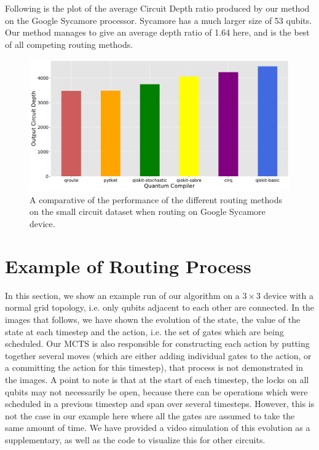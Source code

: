 Following is the plot of the average Circuit Depth ratio produced by our method on the Google Sycamore processor. Sycamore has a much larger size of 53 qubits. Our method manages to give an average depth ratio of 1.64 here, and is the best of all competing routing methods.

\begin{figure}[ht]
    \centering
    \includegraphics[width=\linewidth]{figures/qroute/sycamore.pdf}
    \caption{\label{fig:supp-sycamore-results}A comparative of the performance of the different routing methods on the small circuit dataset when routing on Google Sycamore device.}
\end{figure}

\onecolumn

\section{Example of Routing Process}

In this section, we show an example run of our algorithm on a $3 \times 3$ device with a normal grid topology, i.e. only qubits adjacent to each other are connected. In the images that follows, we have shown the evolution of the state, the value of the state at each timestep and the action, i.e. the set of gates which are being scheduled. Our MCTS is also responsible for constructing each action by putting together several moves (which are either adding individual gates to the action, or a committing the action for this timestep), that process is not demonstrated in the images. A point to note is that at the start of each timestep, the locks on all qubits may not necessarily be open, because there can be operations which were scheduled in a previous timestep and span over several timesteps. However, this is not the case in our example here where all the gates are assumed to take the same amount of time. We have provided a video simulation of this evolution as a supplementary, as well as the code to visualize this for other circuits.

